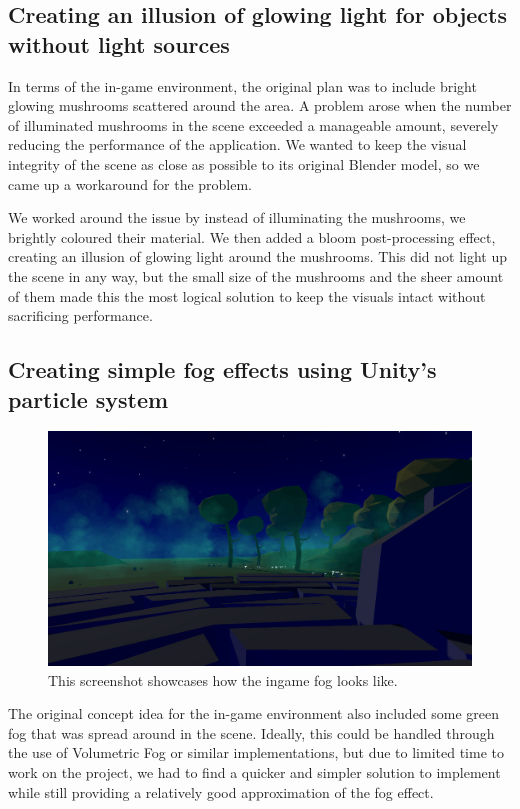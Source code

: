 \subsection{Creating an illusion of glowing light for objects without light sources}
In terms of the in-game environment, the original plan was to include bright glowing mushrooms scattered around the area. A problem arose when the number of illuminated mushrooms in the scene exceeded a manageable amount, severely reducing the performance of the application. We wanted to keep the visual integrity of the scene as close as possible to its original Blender model, so we came up a workaround for the problem.

We worked around the issue by instead of illuminating the mushrooms, we brightly coloured their material. We then added a bloom post-processing effect, creating an illusion of glowing light around the mushrooms. This did not light up the scene in any way, but the small size of the mushrooms and the sheer amount of them made this the most logical solution to keep the visuals intact without sacrificing performance. 

\subsection{Creating simple fog effects using Unity's particle system}
\begin{figure}[tbph]
    \centering
    \includegraphics[width=1.0\textwidth]{images/fog}
    \caption[Screenshot of ingame fog]{This screenshot showcases how the ingame fog looks like.}
    \label{fig:fog}
\end{figure}
The original concept idea for the in-game environment also included some green fog that was spread around in the scene. Ideally, this could be handled through the use of Volumetric Fog or similar implementations, but due to limited time to work on the project, we had to find a quicker and simpler solution to implement while still providing a relatively good approximation of the fog effect. 

